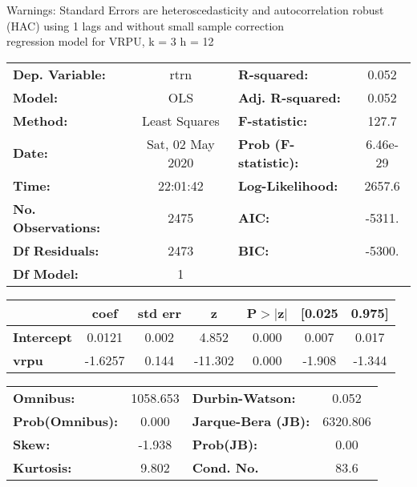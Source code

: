 Warnings: \newline
 [1] Standard Errors are heteroscedasticity and autocorrelation robust (HAC) using 1 lags and without small sample correction\\ 

regression model for VRPU, k = 3 h = 12\begin{center}
\begin{tabular}{lclc}
\toprule
\textbf{Dep. Variable:}    &       rtrn       & \textbf{  R-squared:         } &     0.052   \\
\textbf{Model:}            &       OLS        & \textbf{  Adj. R-squared:    } &     0.052   \\
\textbf{Method:}           &  Least Squares   & \textbf{  F-statistic:       } &     127.7   \\
\textbf{Date:}             & Sat, 02 May 2020 & \textbf{  Prob (F-statistic):} &  6.46e-29   \\
\textbf{Time:}             &     22:01:42     & \textbf{  Log-Likelihood:    } &    2657.6   \\
\textbf{No. Observations:} &        2475      & \textbf{  AIC:               } &    -5311.   \\
\textbf{Df Residuals:}     &        2473      & \textbf{  BIC:               } &    -5300.   \\
\textbf{Df Model:}         &           1      & \textbf{                     } &             \\
\bottomrule
\end{tabular}
\begin{tabular}{lcccccc}
                   & \textbf{coef} & \textbf{std err} & \textbf{z} & \textbf{P$> |$z$|$} & \textbf{[0.025} & \textbf{0.975]}  \\
\midrule
\textbf{Intercept} &       0.0121  &        0.002     &     4.852  &         0.000        &        0.007    &        0.017     \\
\textbf{vrpu}      &      -1.6257  &        0.144     &   -11.302  &         0.000        &       -1.908    &       -1.344     \\
\bottomrule
\end{tabular}
\begin{tabular}{lclc}
\textbf{Omnibus:}       & 1058.653 & \textbf{  Durbin-Watson:     } &    0.052  \\
\textbf{Prob(Omnibus):} &   0.000  & \textbf{  Jarque-Bera (JB):  } & 6320.806  \\
\textbf{Skew:}          &  -1.938  & \textbf{  Prob(JB):          } &     0.00  \\
\textbf{Kurtosis:}      &   9.802  & \textbf{  Cond. No.          } &     83.6  \\
\bottomrule
\end{tabular}
\end{center}

